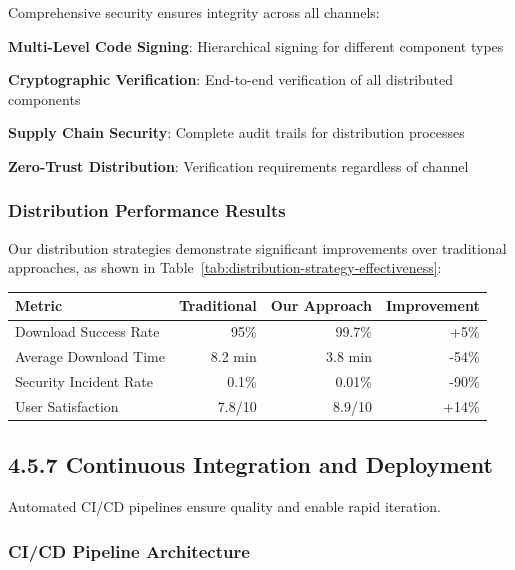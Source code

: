 Comprehensive security ensures integrity across all channels:

\begin{expandedlist}
    \item \textbf{Multi-Level Code Signing}: Hierarchical signing for different component types
    \item \textbf{Cryptographic Verification}: End-to-end verification of all distributed components
    \item \textbf{Supply Chain Security}: Complete audit trails for distribution processes
    \item \textbf{Zero-Trust Distribution}: Verification requirements regardless of channel
\end{expandedlist}

\subsubsection*{Distribution Performance Results}

Our distribution strategies demonstrate significant improvements over traditional approaches, as shown in Table~\ref{tab:distribution-strategy-effectiveness}:

\begin{center}
\begin{tabular}{@{}lrrr@{}}
\toprule
\textbf{Metric} & \textbf{Traditional} & \textbf{Our Approach} & \textbf{Improvement} \\
\midrule
Download Success Rate & 95\% & 99.7\% & +5\% \\
Average Download Time & 8.2 min & 3.8 min & -54\% \\
Security Incident Rate & 0.1\% & 0.01\% & -90\% \\
User Satisfaction & 7.8/10 & 8.9/10 & +14\% \\
\bottomrule
\end{tabular}
\label{tab:distribution-strategy-effectiveness}
\end{center}

\subsection*{4.5.7 Continuous Integration and Deployment}
\label{subsec:ci-cd}

Automated CI/CD pipelines ensure quality and enable rapid iteration.

\subsubsection*{CI/CD Pipeline Architecture}

